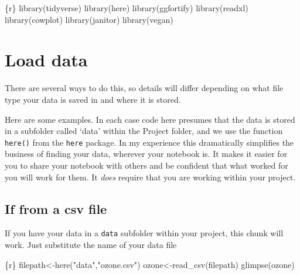 \documentclass[
  letterpaper,
  DIV=11,
  numbers=noendperiod]{scrreprt}
\newenvironment{Shaded}{\begin{snugshade}}{\end{snugshade}}
\newcommand{\InformationTok}[1]{\textcolor[rgb]{0.37,0.37,0.37}{#1}}
\begin{document}
\begin{Shaded}
\begin{Highlighting}[]
\InformationTok{\textasciigrave{}\textasciigrave{}\textasciigrave{}\{r\}}
\InformationTok{library(tidyverse)}
\InformationTok{library(here)}
\InformationTok{library(ggfortify)}
\InformationTok{library(readxl)}
\InformationTok{library(cowplot)}
\InformationTok{library(janitor)}
\InformationTok{library(vegan)}
\InformationTok{\textasciigrave{}\textasciigrave{}\textasciigrave{}}
\end{Highlighting}
\end{Shaded}

\section{Load data}\label{load-data}

There are several ways to do this, so details will differ depending on
what file type your data is saved in and where it is stored.

Here are some examples. In each case code here presumes that the data is
stored in a subfolder called `data' within the Project folder, and we
use the function \texttt{here()} from the \texttt{here} package. In my
experience this dramatically simplifies the business of finding your
data, wherever your notebook is. It makes it easier for you to share
your notebook with others and be confident that what worked for you will
work for them. It \emph{does} require that you are working within your
project.

\subsection{If from a csv file}\label{if-from-a-csv-file}

If you have your data in a \texttt{data} subfolder within your project,
this chunk will work. Just substitute the name of your data file

\begin{Shaded}
\begin{Highlighting}[]
\InformationTok{\textasciigrave{}\textasciigrave{}\textasciigrave{}\{r\}}
\InformationTok{filepath\textless{}{-}here("data","ozone.csv")}
\InformationTok{ozone\textless{}{-}read\_csv(filepath)}
\InformationTok{glimpse(ozone)}
\InformationTok{\textasciigrave{}\textasciigrave{}\textasciigrave{}}
\end{Highlighting}
\end{Shaded}
\end{document}

